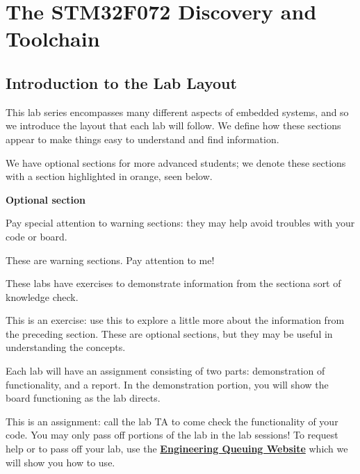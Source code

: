 \documentclass[openany,11pt,fleqn]{book} %
\begin{document}
	


\tableofcontents
\chapter{The STM32F072 Discovery and Toolchain}
\section{Introduction to the Lab Layout}
This lab series encompasses many different aspects of embedded systems, and so we introduce the layout that each lab will follow. We define how these sections appear to make things easy to understand and find information.

We have optional sections for more advanced students; we denote these sections with a section highlighted in orange, seen below.

{\addvspace{6pt}\sffamily\bfseries\centering\contentslabel[\thecontentslabel]{1.25cm}\color{orange}Optional section}
\vspace{3mm}

Pay special attention to warning sections: they may help avoid troubles with your code or board.
\begin{warning}
	These are warning sections. Pay attention to me!
\end{warning}

These labs have exercises to demonstrate information from the section\textemdash a sort of knowledge check.
\begin{exercise}
	This is an exercise: use this to explore a little more about the information from the preceding section. These are optional sections, but they may be useful in understanding the concepts.
\end{exercise}

Each lab will have an assignment consisting of two parts: demonstration of functionality, and a report. In the demonstration portion, you will show the board functioning as the lab directs.

\begin{assignment}\label{check1}
	This is an assignment: call the lab TA to come check the functionality of your code. You may only pass off portions of the lab in the lab sessions! To request help or to pass off your lab, use the \href{http://nine.eng.utah.edu/}{\textbf{Engineering Queuing Website}} which we will show you how to use.
\end{assignment}
\end{document}
